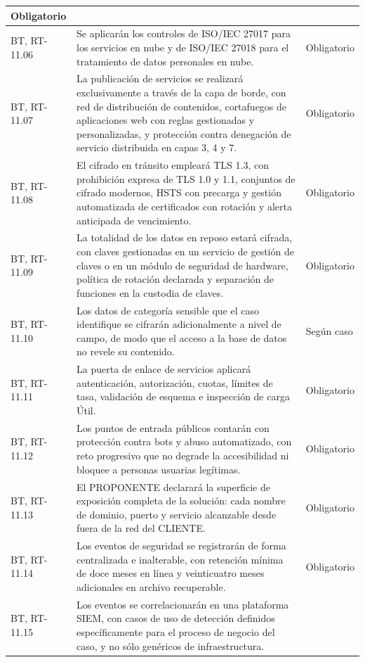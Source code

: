 \begin{longtable}{|L{0.098425\AnchoTablaAnexo}|L{0.814961\AnchoTablaAnexo}|L{0.086614\AnchoTablaAnexo}|}
Obligatorio \\ \hline
BT, RT-11.06 &
Se aplicarán los controles de ISO/IEC 27017 para los servicios en nube y de ISO/IEC 27018 para el tratamiento de datos personales en nube. &
Obligatorio \\ \hline
{}
BT, RT-11.07 &
La publicación de servicios se realizará exclusivamente a través de la capa de borde, con red de distribución de contenidos, cortafuegos de aplicaciones web con reglas gestionadas y personalizadas, y protección contra denegación de servicio distribuida en capas 3, 4 y 7. &
Obligatorio \\ \hline
BT, RT-11.08 &
El cifrado en tránsito empleará TLS 1.3, con prohibición expresa de TLS 1.0 y 1.1, conjuntos de cifrado modernos, HSTS con precarga y gestión automatizada de certificados con rotación y alerta anticipada de vencimiento. &
Obligatorio \\ \hline
{}
BT, RT-11.09 &
La totalidad de los datos en reposo estará cifrada, con claves gestionadas en un servicio de gestión de claves o en un módulo de seguridad de hardware, política de rotación declarada y separación de funciones en la custodia de claves. &
Obligatorio \\ \hline
BT, RT-11.10 &
Los datos de categoría sensible que el caso identifique se cifrarán adicionalmente a nivel de campo, de modo que el acceso a la base de datos no revele su contenido. &
Según caso \\ \hline
{}
BT, RT-11.11 &
La puerta de enlace de servicios aplicará autenticación, autorización, cuotas, límites de tasa, validación de esquema e inspección de carga Útil. &
Obligatorio \\ \hline
BT, RT-11.12 &
Los puntos de entrada públicos contarán con protección contra bots y abuso automatizado, con reto progresivo que no degrade la accesibilidad ni bloquee a personas usuarias legítimas. &
Obligatorio \\ \hline
{}
BT, RT-11.13 &
El PROPONENTE declarará la superficie de exposición completa de la solución: cada nombre de dominio, puerto y servicio alcanzable desde fuera de la red del CLIENTE. &
Obligatorio \\ \hline
BT, RT-11.14 &
Los eventos de seguridad se registrarán de forma centralizada e inalterable, con retención mínima de doce meses en línea y veinticuatro meses adicionales en archivo recuperable. &
Obligatorio \\ \hline
{}
BT, RT-11.15 &
Los eventos se correlacionarán en una plataforma SIEM, con casos de uso de detección definidos específicamente para el proceso de negocio del caso, y no sólo genéricos de infraestructura. &

\end{longtable}
